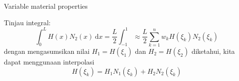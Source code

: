Variable material properties

Tinjau integral:
$$
\int_{0}^{L} H(x) N_{2}(x)\ \mathrm{d}x = \frac{L}{2}\int_{-1}^{1} \approx
\frac{L}{2}\sum_{k=1}^{n} w_{k} H(\xi_{k}) N_{2}(\xi_{k})
$$
dengan mengasumsikan nilai $H_1 = H(\xi_1)$ dan $H_2 = H(\xi_2)$ diketahui, kita dapat menggunaan interpolasi
$$
H(\xi_{k}) = H_1 N_{1}(\xi_{k}) + H_2 N_{2}(\xi_{k})
$$


%
%


